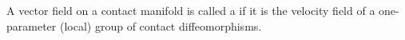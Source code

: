 A vector field on a contact manifold is called a  if it is the velocity field of a one-parameter (local) group of contact diffeomorphisms.
